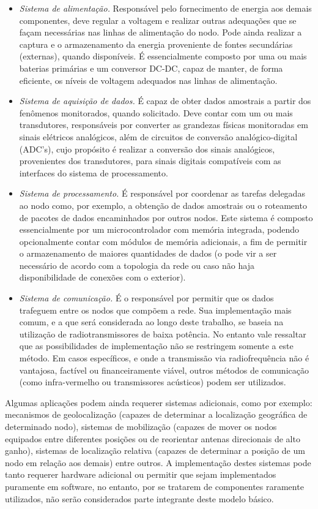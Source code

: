 \documentclass[
	12pt,				%
	openright,			%
	oneside,
	a4paper,			%
	english,			%
	french,				%
	spanish,			%
	brazil				%
	]{abntex2}
\begin{document}
\begin{itemize}
	\item \textit{Sistema de alimentação.} Responsável pelo fornecimento de energia aos demais componentes, deve regular a voltagem e realizar outras adequações que se façam necessárias nas linhas de alimentação do nodo. Pode ainda realizar a captura e o armazenamento da energia proveniente de fontes secundárias (externas), quando disponíveis. É essencialmente composto por uma ou mais baterias primárias e um conversor DC-DC, capaz de manter, de forma eficiente, os níveis de voltagem adequados nas linhas de alimentação.
	\item \textit{Sistema de aquisição de dados.} É capaz de obter dados amostrais a partir dos fenômenos monitorados, quando solicitado. Deve contar com um ou mais transdutores, responsáveis por converter as grandezas físicas monitoradas em sinais elétricos analógicos, além de circuitos de conversão analógico-digital (ADC's), cujo propósito é realizar a conversão dos sinais analógicos, provenientes dos transdutores, para sinais digitais compatíveis com as interfaces do sistema de processamento.
	\item \textit{Sistema de processamento.} É responsável por coordenar as tarefas delegadas ao nodo como, por exemplo, a obtenção de dados amostrais ou o roteamento de pacotes de dados encaminhados por outros nodos. Este sistema é composto essencialmente por um microcontrolador com memória integrada, podendo opcionalmente contar com módulos de memória adicionais, a fim de permitir o armazenamento de maiores quantidades de dados (o pode vir a ser necessário de acordo com a topologia da rede ou caso não haja disponibilidade de conexões com o exterior).
	\item \textit{Sistema de comunicação.} É o responsável por permitir que os dados trafeguem entre os nodos que compõem a rede. Sua implementação mais comum, e a que será considerada ao longo deste trabalho, se baseia na utilização de radiotransmissores de baixa potência. No entanto vale ressaltar que as possibilidades de implementação não se restringem somente a este método. Em casos específicos, e onde a transmissão via radiofrequência não é vantajosa, factível ou financeiramente viável, outros métodos de comunicação (como infra-vermelho ou transmissores acústicos) podem ser utilizados.
\end{itemize}

Algumas aplicações podem ainda requerer sistemas adicionais, como por exemplo: mecanismos de geolocalização (capazes de determinar a localização geográfica de determinado nodo), sistemas de mobilização (capazes de mover os nodos equipados entre diferentes posições ou de reorientar antenas direcionais de alto ganho), sistemas de localização relativa (capazes de determinar a posição de um nodo em relação aos demais) entre outros. A implementação destes sistemas pode tanto requerer hardware adicional ou permitir que sejam implementados puramente em software, no entanto, por se tratarem de componentes raramente utilizados, não serão considerados parte integrante deste modelo básico.
\end{document}
